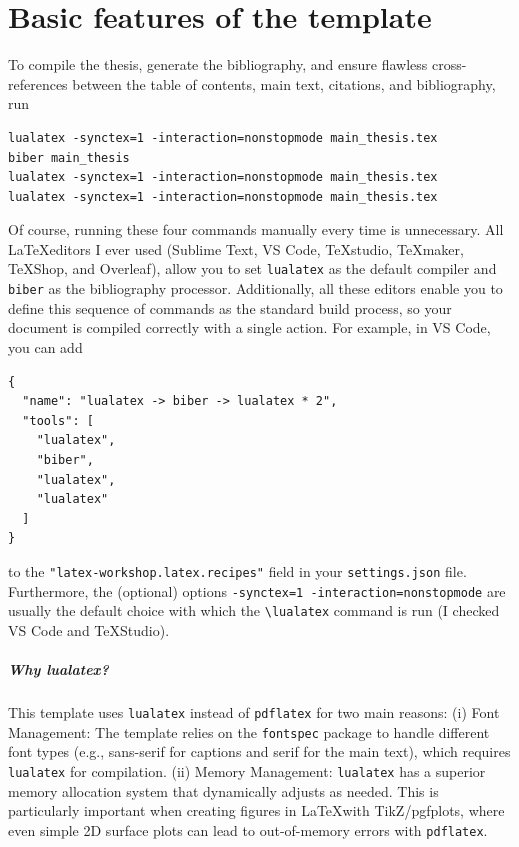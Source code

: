 \graphicspath{{chapters/1_basicfeatures/figures/}}

\chapter{Basic features of the template}
To compile the thesis, generate the bibliography, and ensure flawless cross-references between the table of contents, main text, citations, and bibliography, run
\begin{lstlisting}
lualatex -synctex=1 -interaction=nonstopmode main_thesis.tex
biber main_thesis
lualatex -synctex=1 -interaction=nonstopmode main_thesis.tex
lualatex -synctex=1 -interaction=nonstopmode main_thesis.tex
\end{lstlisting}
Of course, running these four commands manually every time is unnecessary. All \LaTeX editors I ever used (Sublime Text, VS Code, TeXstudio, TeXmaker, TeXShop, and Overleaf), allow you to set \verb|lualatex| as the default compiler and \verb|biber| as the bibliography processor. Additionally, all these editors enable you to define this sequence of commands as the standard build process, so your document is compiled correctly with a single action.
For example, in VS Code, you can add 
\begin{lstlisting}
{
  "name": "lualatex -> biber -> lualatex * 2",
  "tools": [
    "lualatex",
    "biber",
    "lualatex",
    "lualatex"
  ]
}
\end{lstlisting}
to the \verb|"latex-workshop.latex.recipes"| field in your \verb|settings.json| file.
Furthermore, the (optional) options \verb|-synctex=1 -interaction=nonstopmode| are usually the default choice with which the \verb|\lualatex| command is run (I checked VS Code and TeXStudio).

\paragraph{Why lualatex?} 
This template uses \verb|lualatex| instead of \verb|pdflatex| for two main reasons:
(i) Font Management: The template relies on the \verb|fontspec| package to handle different font types (e.g., sans-serif for captions and serif for the main text), which requires \verb|lualatex| for compilation.
(ii) Memory Management: \verb|lualatex| has a superior memory allocation system that dynamically adjusts as needed. This is particularly important when creating figures in \LaTeX with TikZ/pgfplots, where even simple 2D surface plots can lead to out-of-memory errors with \verb|pdflatex|.

